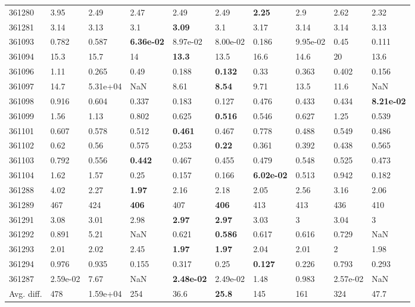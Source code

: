 \begin{table}[ht!]
\begin{tabular}{llllllllll}
  361280 & 3.95 & 2.49 & 2.47 & 2.49 & 2.49 & \textbf{2.25} & 2.9 & 2.62 & 2.32 \\ 
  361281 & 3.14 & 3.13 & 3.1 & \textbf{3.09} & 3.1 & 3.17 & 3.14 & 3.14 & 3.13 \\ 
  361093 & 0.782 & 0.587 & \textbf{6.36e-02} & 8.97e-02 & 8.00e-02 & 0.186 & 9.95e-02 & 0.45 & 0.111 \\ 
  361094 & 15.3 & 15.7 & 14 & \textbf{13.3} & 13.5 & 16.6 & 14.6 & 20 & 13.6 \\ 
  361096 & 1.11 & 0.265 & 0.49 & 0.188 & \textbf{0.132} & 0.33 & 0.363 & 0.402 & 0.156 \\ 
  361097 & 14.7 & 5.31e+04 & NaN & 8.61 & \textbf{8.54} & 9.71 & 13.5 & 11.6 & NaN \\ 
  361098 & 0.916 & 0.604 & 0.337 & 0.183 & 0.127 & 0.476 & 0.433 & 0.434 & \textbf{8.21e-02} \\ 
  361099 & 1.56 & 1.13 & 0.802 & 0.625 & \textbf{0.516} & 0.546 & 0.627 & 1.25 & 0.539 \\ 
  361101 & 0.607 & 0.578 & 0.512 & \textbf{0.461} & 0.467 & 0.778 & 0.488 & 0.549 & 0.486 \\ 
  361102 & 0.62 & 0.56 & 0.575 & 0.253 & \textbf{0.22} & 0.361 & 0.392 & 0.438 & 0.565 \\ 
  361103 & 0.792 & 0.556 & \textbf{0.442} & 0.467 & 0.455 & 0.479 & 0.548 & 0.525 & 0.473 \\ 
  361104 & 1.62 & 1.57 & 0.25 & 0.157 & 0.166 & \textbf{6.02e-02} & 0.513 & 0.942 & 0.182 \\ 
  361288 & 4.02 & 2.27 & \textbf{1.97} & 2.16 & 2.18 & 2.05 & 2.56 & 3.16 & 2.06 \\ 
  361289 & 467 & 424 & \textbf{406} & 407 & \textbf{406} & 413 & 413 & 436 & 410 \\ 
  361291 & 3.08 & 3.01 & 2.98 & \textbf{2.97} & \textbf{2.97} & 3.03 & 3 & 3.04 & 3 \\ 
  361292 & 0.891 & 5.21 & NaN & 0.621 & \textbf{0.586} & 0.617 & 0.616 & 0.729 & NaN \\ 
  361293 & 2.01 & 2.02 & 2.45 & \textbf{1.97} & \textbf{1.97} & 2.04 & 2.01 & 2 & 1.98 \\ 
  361294 & 0.976 & 0.935 & 0.155 & 0.317 & 0.25 & \textbf{0.127} & 0.226 & 0.793 & 0.293 \\ 
  361287 & 2.59e-02 & 7.67 & NaN & \textbf{2.48e-02} & 2.49e-02 & 1.48 & 0.983 & 2.57e-02 & NaN \\ 
   \hline
Avg. diff. & 478 & 1.59e+04 & 254 & 36.6 & \textbf{25.8} & 145 & 161 & 324 & 47.7 \\ 

\end{tabular}
\end{table}
